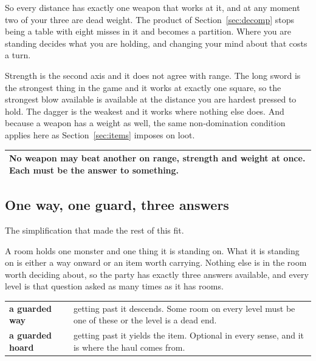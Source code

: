 \documentclass[11pt,a4paper]{article}
\begin{document}
\begin{sectionbox}
So every distance has exactly one weapon that works at it, and at any moment two of your three are
dead weight. The product of Section~\ref{sec:decomp} stops being a table with eight misses in it
and becomes a partition. Where you are standing decides what you are holding, and changing your
mind about that costs a turn.
\end{sectionbox}

Strength is the second axis and it does not agree with range. The long sword is the strongest thing
in the game and it works at exactly one square, so the strongest blow available is available at the
distance you are hardest pressed to hold. The dagger is the weakest and it works where nothing else
does. And because a weapon has a weight as well, the same non-domination condition applies here as
Section~\ref{sec:items} imposes on loot.

\begin{center}
\begin{tabular}{@{}>{\raggedright\arraybackslash}p{}@{}}
\toprule
\textbf{No weapon may beat another on range, strength and weight at once.} Each must be the answer
to something. \\
\bottomrule
\end{tabular}
\end{center}

\subsection{One way, one guard, three answers}
\label{sec:oneguard}

The simplification that made the rest of this fit.

A room holds one monster and one thing it is standing on. What it is standing on is either a way
onward or an item worth carrying. Nothing else is in the room worth deciding about, so the party
has exactly three answers available, and every level is that question asked as many times as it
has rooms.

\begin{center}
\begin{tabular}{@{}l@{\hspace{5mm}}>{\raggedright\arraybackslash}p{}@{}}
\toprule
\textbf{a guarded way}  & getting past it descends. Some room on every level must be one of
these or the level is a dead end. \\
\textbf{a guarded hoard}& getting past it yields the item. Optional in every sense, and it is
where the haul comes from. \\
\bottomrule
\end{tabular}
\end{center}
\end{document}
